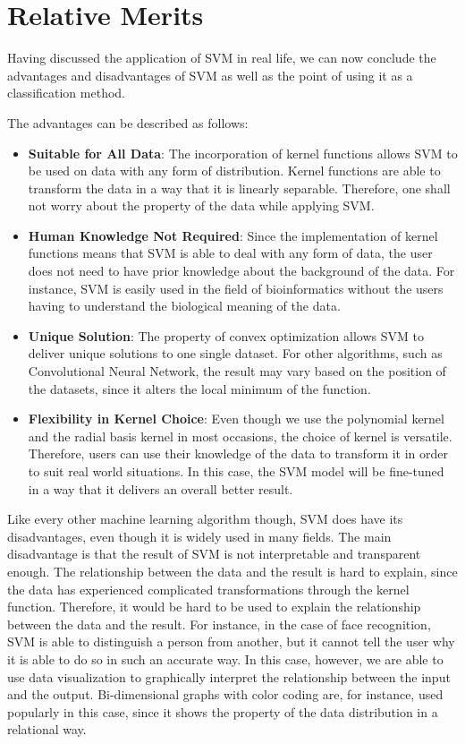 \section{Relative Merits}
Having discussed the application of SVM in real life, we can now conclude
the advantages and disadvantages of SVM as well as the point of using it 
as a classification method. 

The advantages can be described as follows:
\begin{itemize}
    \item \textbf{Suitable for All Data}: The incorporation of kernel functions
    allows SVM to be used on data with any form of distribution. Kernel functions
    are able to transform the data in a way that it is linearly separable. Therefore,
    one shall not worry about the property of the data while applying SVM.
    \item \textbf{Human Knowledge Not Required}: Since the implementation of kernel functions
    means that SVM is able to deal with any form of data, the user does not need to 
    have prior knowledge about the background of the data. For instance, SVM is easily
    used in the field of bioinformatics without the users having to understand the 
    biological meaning of the data.
    \item \textbf{Unique Solution}: The property of convex optimization allows SVM
    to deliver unique solutions to one single dataset. For other algorithms, 
    such as Convolutional Neural Network, the result may vary based on the position of
    the datasets, since it alters the local minimum of the function.
    \item \textbf{Flexibility in Kernel Choice}: Even though we use the polynomial
    kernel and the radial basis kernel in most occasions, the choice of kernel is
    versatile. Therefore, users can use their knowledge of the data to transform it
    in order to suit real world situations. In this
    case, the SVM model will be fine-tuned in a way that it delivers an overall better
    result.
\end{itemize}

Like every other machine learning algorithm though,
SVM does have its disadvantages, even though it is widely used in many
fields. The main disadvantage is that the result of SVM is not 
interpretable and transparent enough. The relationship between the data
and the result is hard to explain, since the data has experienced 
complicated transformations through the kernel function.
Therefore, it would be hard to be used to explain
the relationship between the data and the result. For instance,
in the case of face recognition, SVM is able to distinguish
a person from another, but it cannot tell the user why it is
able to do so in such an accurate way. In this case, however, 
we are able to use data visualization to graphically interpret the relationship
between the input and the output. Bi-dimensional graphs with color coding are, 
for instance, used popularly in this case, since it shows the property of
the data distribution in a relational way. 
\cite{procon}
